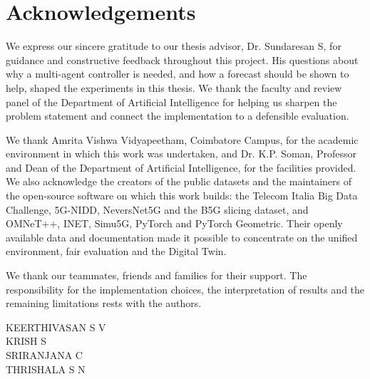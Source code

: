 \documentclass[a4paper, 12pt]{report}
\theoremstyle{definition}
\begin{document}
	\clearpage
	\tableofcontents
	
	\chapter*{Acknowledgements}
We express our sincere gratitude to our thesis advisor, Dr. Sundaresan S, for guidance and constructive feedback throughout this project. His questions about why a multi-agent controller is needed, and how a forecast should be shown to help, shaped the experiments in this thesis. We thank the faculty and review panel of the Department of Artificial Intelligence for helping us sharpen the problem statement and connect the implementation to a defensible evaluation.

\hspace{1.5em}We thank Amrita Vishwa Vidyapeetham, Coimbatore Campus, for the academic environment in which this work was undertaken, and Dr. K.P. Soman, Professor and Dean of the Department of Artificial Intelligence, for the facilities provided. We also acknowledge the creators of the public datasets and the maintainers of the open-source software on which this work builds: the Telecom Italia Big Data Challenge, 5G-NIDD, NeversNet5G and the B5G slicing dataset, and OMNeT++, INET, Simu5G, PyTorch and PyTorch Geometric. Their openly available data and documentation made it possible to concentrate on the unified environment, fair evaluation and the Digital Twin.

\hspace{1.5em}We thank our teammates, friends and families for their support. The responsibility for the implementation choices, the interpretation of results and the remaining limitations rests with the authors.

\vspace{1cm}
\begin{flushright}
KEERTHIVASAN S V\\
KRISH S\\
SRIRANJANA C\\
THRISHALA S N
\end{flushright}
\clearpage
\listoffigures
	\listoftables
	\newpage
\end{document}
